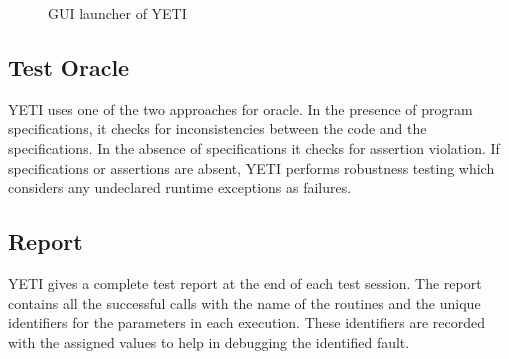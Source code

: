 \begin{figure}[h]
	\centering
	\caption{GUI launcher of YETI}
	\label{fig:yetiLauncher}
\end{figure}


\subsection{Test Oracle}
YETI uses one of the two approaches for oracle. In the presence of program specifications, it checks for inconsistencies between the code and the specifications. In the absence of specifications it checks for assertion violation.%
If specifications or assertions are absent, YETI performs robustness testing which considers any undeclared runtime exceptions as failures. 


\subsection{Report}
YETI gives a complete test report at the end of each test session. The report contains all the successful calls with the name of the routines and the unique identifiers for the parameters in each execution. These identifiers are recorded with the assigned values to help in debugging the identified fault. 

